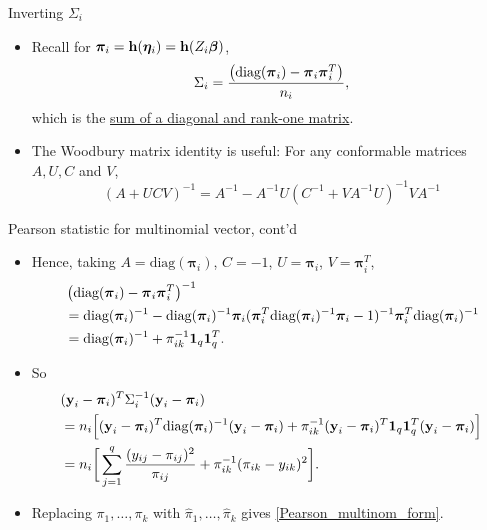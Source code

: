 \documentclass{beamer}
\newcommand{\boldpi}{{\boldsymbol \pi}}
\newenvironment{wideitemize}%
  {\begin{itemize}%
    \setlength{\parskip}{1em}}%
  {\end{itemize}}
\begin{document}

\begin{frame}{Inverting $\Sigma_i$}
\begin{wideitemize}
 \item Recall for $\boldpi_i  = {\bf h}({\boldsymbol \eta}_i) = {\bf h}(Z_i{\boldsymbol \beta})$, 
\[
\Sigma_i =\frac{\left(\mbox{diag}(\mbox{\boldmath $\pi$}_i)-\mbox{\boldmath $\pi$}_i
\mbox{\boldmath $\pi$}_i^T\right)}{n_i},
\]
which is the \underline{sum of a diagonal and  rank-one matrix}.

\item The Woodbury matrix identity is useful: For any conformable  matrices $A, U, C$  and $V$,
\[
(A + UCV)^{-1} = A^{-1} - A^{-1}  U(C^{-1} + V A^{-1}U)^{-1} V A^{-1}
\]



\end{wideitemize}
\end{frame}



\begin{frame}{Pearson statistic for multinomial vector, cont'd}
\begin{wideitemize}
\item  Hence, taking $A = \text{diag}(\boldpi_i)$, $C = -1$, $U = \boldpi_i$, $V =  \boldpi_i^T$,
\begin{align*}
&\left(\mbox{diag}(\mbox{\boldmath $\pi$}_i)-\mbox{\boldmath $\pi$}_i
\mbox{\boldmath $\pi$}_i^T\right)^{-1} \\
&= \text{diag}(\boldpi_i)^{-1} -  \text{diag}(\boldpi_i)^{-1} \boldpi_i (  \boldpi_i^T \text{diag}(\boldpi_i)^{-1}  \boldpi_i - 1 )^{-1}  \boldpi_i^T \text{diag}(\boldpi_i)^{-1}\\
&= \text{diag}(\boldpi_i)^{-1} +\pi_{ik}^{-1} {\bf 1}_q {\bf 1}_q^T.
\end{align*}


\item So 
\begin{align*}
& (\textbf{y}_i- \boldpi_i)^T
\Sigma_i^{-1}  (\textbf{y}_i- \boldpi_i)\\
&= n_i \Big[(\textbf{y}_i- \boldpi_i)^T \text{diag}(\boldpi_i)^{-1}(\textbf{y}_i- \boldpi_i) + \pi_{ik}^{-1} (\textbf{y}_i- \boldpi_i)^T {\bf 1}_q {\bf 1}_q^T  (\textbf{y}_i- \boldpi_i) \Big] \\
&= n_i \bigg[\sum_{j=1}^q\frac{(y_{ij}-{\pi}_{ij})^2}{{\pi}_{ij}} + \pi_{ik}^{-1} (\pi_{ik} - y_{ik} )^2\bigg].
\end{align*}

\item Replacing $\pi_1, \dots, \pi_k$ with $\hat{\pi}_1, \dots, \hat{\pi}_k$ gives \eqref{Pearson_multinom_form}.
\end{wideitemize}


\end{frame}
\end{document}
